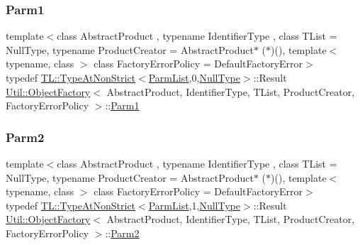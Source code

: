 \subsubsection{\texorpdfstring{Parm1}{Parm1}\hspace{0.1cm}{\footnotesize\ttfamily [3/3]}}
{\footnotesize\ttfamily template$<$class Abstract\+Product , typename Identifier\+Type , class T\+List  = Null\+Type, typename Product\+Creator  = Abstract\+Product$\ast$ ($\ast$)(), template$<$ typename, class $>$ class Factory\+Error\+Policy = Default\+Factory\+Error$>$ \\
typedef \mbox{\hyperlink{structUtil_1_1TL_1_1TypeAtNonStrict}{T\+L\+::\+Type\+At\+Non\+Strict}}$<$\mbox{\hyperlink{classUtil_1_1ObjectFactory_a46f003a5928e8a60140e0a74ac261c36}{Parm\+List}},0,\mbox{\hyperlink{classUtil_1_1NullType}{Null\+Type}}$>$\+::Result \mbox{\hyperlink{classUtil_1_1ObjectFactory}{Util\+::\+Object\+Factory}}$<$ Abstract\+Product, Identifier\+Type, T\+List, Product\+Creator, Factory\+Error\+Policy $>$\+::\mbox{\hyperlink{classUtil_1_1ObjectFactory_a47e4f863537be7a4f5f5972691bb0b57}{Parm1}}}

\mbox{\label{classUtil_1_1ObjectFactory_ae438d0c17d1510e6fd7db9ac479a371f}} 
\subsubsection{\texorpdfstring{Parm2}{Parm2}\hspace{0.1cm}{\footnotesize\ttfamily [1/3]}}
{\footnotesize\ttfamily template$<$class Abstract\+Product , typename Identifier\+Type , class T\+List  = Null\+Type, typename Product\+Creator  = Abstract\+Product$\ast$ ($\ast$)(), template$<$ typename, class $>$ class Factory\+Error\+Policy = Default\+Factory\+Error$>$ \\
typedef \mbox{\hyperlink{structUtil_1_1TL_1_1TypeAtNonStrict}{T\+L\+::\+Type\+At\+Non\+Strict}}$<$\mbox{\hyperlink{classUtil_1_1ObjectFactory_a46f003a5928e8a60140e0a74ac261c36}{Parm\+List}},1,\mbox{\hyperlink{classUtil_1_1NullType}{Null\+Type}}$>$\+::Result \mbox{\hyperlink{classUtil_1_1ObjectFactory}{Util\+::\+Object\+Factory}}$<$ Abstract\+Product, Identifier\+Type, T\+List, Product\+Creator, Factory\+Error\+Policy $>$\+::\mbox{\hyperlink{classUtil_1_1ObjectFactory_ae438d0c17d1510e6fd7db9ac479a371f}{Parm2}}}

